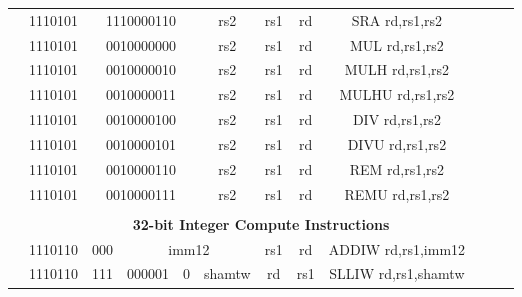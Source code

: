 \begin{table}[p]
\begin{small}
\begin{center}
\begin{tabular}{rcccccccccccl}
&
\multicolumn{1}{|c|}{1110101} &
\multicolumn{4}{c|}{1110000110} &
\multicolumn{1}{c|}{rs2} &
\multicolumn{1}{c|}{rs1} &
\multicolumn{1}{c|}{rd} & SRA rd,rs1,rs2 \\
\cline{2-9}
  

&
\multicolumn{1}{|c|}{1110101} &
\multicolumn{4}{c|}{0010000000} &
\multicolumn{1}{c|}{rs2} &
\multicolumn{1}{c|}{rs1} &
\multicolumn{1}{c|}{rd} & MUL rd,rs1,rs2 \\
\cline{2-9}
  

&
\multicolumn{1}{|c|}{1110101} &
\multicolumn{4}{c|}{0010000010} &
\multicolumn{1}{c|}{rs2} &
\multicolumn{1}{c|}{rs1} &
\multicolumn{1}{c|}{rd} & MULH rd,rs1,rs2 \\
\cline{2-9}
  

&
\multicolumn{1}{|c|}{1110101} &
\multicolumn{4}{c|}{0010000011} &
\multicolumn{1}{c|}{rs2} &
\multicolumn{1}{c|}{rs1} &
\multicolumn{1}{c|}{rd} & MULHU rd,rs1,rs2 \\
\cline{2-9}
  

&
\multicolumn{1}{|c|}{1110101} &
\multicolumn{4}{c|}{0010000100} &
\multicolumn{1}{c|}{rs2} &
\multicolumn{1}{c|}{rs1} &
\multicolumn{1}{c|}{rd} & DIV rd,rs1,rs2 \\
\cline{2-9}
  

&
\multicolumn{1}{|c|}{1110101} &
\multicolumn{4}{c|}{0010000101} &
\multicolumn{1}{c|}{rs2} &
\multicolumn{1}{c|}{rs1} &
\multicolumn{1}{c|}{rd} & DIVU rd,rs1,rs2 \\
\cline{2-9}
  

&
\multicolumn{1}{|c|}{1110101} &
\multicolumn{4}{c|}{0010000110} &
\multicolumn{1}{c|}{rs2} &
\multicolumn{1}{c|}{rs1} &
\multicolumn{1}{c|}{rd} & REM rd,rs1,rs2 \\
\cline{2-9}
  

&
\multicolumn{1}{|c|}{1110101} &
\multicolumn{4}{c|}{0010000111} &
\multicolumn{1}{c|}{rs2} &
\multicolumn{1}{c|}{rs1} &
\multicolumn{1}{c|}{rd} & REMU rd,rs1,rs2 \\
\cline{2-9}
  

&
\multicolumn{11}{c}{} & \\
&
\multicolumn{11}{c}{\bf 32-bit Integer Compute Instructions} & \\
\cline{2-9}
  

&
\multicolumn{1}{|c|}{1110110} &
\multicolumn{1}{c|}{000} &
\multicolumn{4}{c|}{imm12} &
\multicolumn{1}{c|}{rs1} &
\multicolumn{1}{c|}{rd} & ADDIW rd,rs1,imm12 \\
\cline{2-9}
  

&
\multicolumn{1}{|c|}{1110110} &
\multicolumn{1}{c|}{111} &
\multicolumn{2}{c|}{000001} &
\multicolumn{1}{c|}{0} &
\multicolumn{1}{c|}{shamtw} &
\multicolumn{1}{c|}{rd} &
\multicolumn{1}{c|}{rs1} & SLLIW rd,rs1,shamtw \\
\cline{2-9}
  


\end{tabular}
\end{center}
\end{small}
\end{table}
